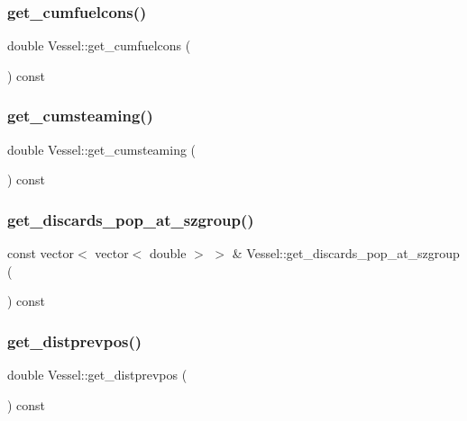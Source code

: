 \subsubsection{\texorpdfstring{get\_cumfuelcons()}{get\_cumfuelcons()}}
{\footnotesize\ttfamily double Vessel\+::get\+\_\+cumfuelcons (\begin{DoxyParamCaption}{ }\end{DoxyParamCaption}) const}

\mbox{\label{class_vessel_a43abe92a9ed7708b26e9d350958eefff}} 
\subsubsection{\texorpdfstring{get\_cumsteaming()}{get\_cumsteaming()}}
{\footnotesize\ttfamily double Vessel\+::get\+\_\+cumsteaming (\begin{DoxyParamCaption}{ }\end{DoxyParamCaption}) const}

\mbox{\label{class_vessel_a0062ade3b9d0efa38a020490848bfc8d}} 
\subsubsection{\texorpdfstring{get\_discards\_pop\_at\_szgroup()}{get\_discards\_pop\_at\_szgroup()}}
{\footnotesize\ttfamily const vector$<$ vector$<$ double $>$ $>$ \& Vessel\+::get\+\_\+discards\+\_\+pop\+\_\+at\+\_\+szgroup (\begin{DoxyParamCaption}{ }\end{DoxyParamCaption}) const}

\mbox{\label{class_vessel_a24d41cf7b950b9a1258077b2ce1555f3}} 
\subsubsection{\texorpdfstring{get\_distprevpos()}{get\_distprevpos()}}
{\footnotesize\ttfamily double Vessel\+::get\+\_\+distprevpos (\begin{DoxyParamCaption}{ }\end{DoxyParamCaption}) const}

